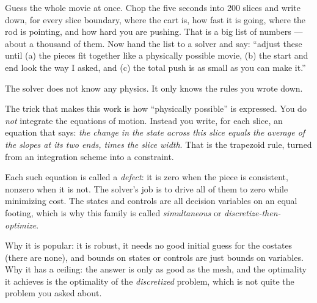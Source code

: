 \documentclass[11pt]{article}
\begin{document}
\begin{eli}
Guess the whole movie at once. Chop the five seconds into 200 slices and write
down, for every slice boundary, where the cart is, how fast it is going, where
the rod is pointing, and how hard you are pushing. That is a big list of
numbers --- about a thousand of them. Now hand the list to a solver and say:
``adjust these until (a) the pieces fit together like a physically possible
movie, (b) the start and end look the way I asked, and (c) the total push is as
small as you can make it.''

The solver does not know any physics. It only knows the rules you wrote down.
\end{eli}

\begin{intu}
The trick that makes this work is how ``physically possible'' is expressed. You
do \emph{not} integrate the equations of motion. Instead you write, for each
slice, an equation that says: \emph{the change in the state across this slice
equals the average of the slopes at its two ends, times the slice width}. That
is the trapezoid rule, turned from an integration scheme into a constraint.

Each such equation is called a \emph{defect}: it is zero when the piece is
consistent, nonzero when it is not. The solver's job is to drive all of them to
zero while minimizing cost. The states and controls are all decision variables
on an equal footing, which is why this family is called
\emph{simultaneous} or \emph{discretize-then-optimize}.

Why it is popular: it is robust, it needs no good initial guess for the
costates (there are none), and bounds on states or controls are just bounds on
variables. Why it has a ceiling: the answer is only as good as the mesh, and the
optimality it achieves is the optimality of the \emph{discretized} problem,
which is not quite the problem you asked about.
\end{intu}
\end{document}
